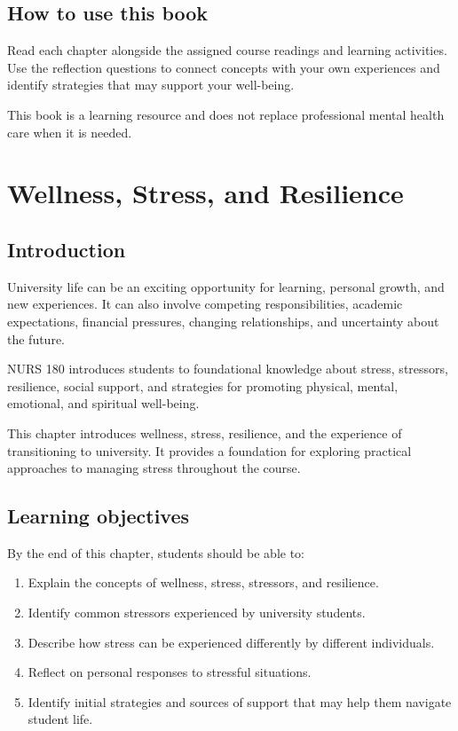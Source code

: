 \documentclass[
  letterpaper,
]{book}
\providecommand{\tightlist}{%
  \setlength{\itemsep}{0pt}\setlength{\parskip}{0pt}}
\begin{document}
\section{How to use this book}\label{how-to-use-this-book}

Read each chapter alongside the assigned course readings and learning
activities. Use the reflection questions to connect concepts with your
own experiences and identify strategies that may support your
well-being.

This book is a learning resource and does not replace professional
mental health care when it is needed.


\chapter{Wellness, Stress, and
Resilience}\label{wellness-stress-and-resilience}

\section{Introduction}\label{introduction}

University life can be an exciting opportunity for learning, personal
growth, and new experiences. It can also involve competing
responsibilities, academic expectations, financial pressures, changing
relationships, and uncertainty about the future.

NURS 180 introduces students to foundational knowledge about stress,
stressors, resilience, social support, and strategies for promoting
physical, mental, emotional, and spiritual well-being.

This chapter introduces wellness, stress, resilience, and the experience
of transitioning to university. It provides a foundation for exploring
practical approaches to managing stress throughout the course.

\section{Learning objectives}\label{learning-objectives}

By the end of this chapter, students should be able to:

\begin{enumerate}
\def\labelenumi{\arabic{enumi}.}
\tightlist
\item
  Explain the concepts of wellness, stress, stressors, and resilience.
\item
  Identify common stressors experienced by university students.
\item
  Describe how stress can be experienced differently by different
  individuals.
\item
  Reflect on personal responses to stressful situations.
\item
  Identify initial strategies and sources of support that may help them
  navigate student life.
\end{enumerate}
\end{document}
